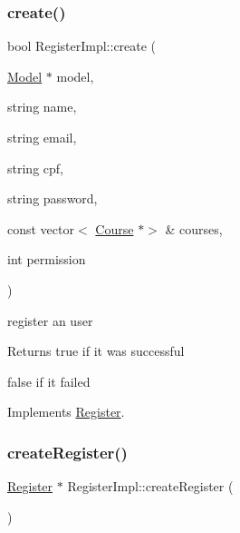 \mbox{\label{classRegisterImpl_af0463a5627b02b797a4a9d5d90f55a46}} 
\subsubsection{\texorpdfstring{create()}{create()}}
{\footnotesize\ttfamily bool Register\+Impl\+::create (\begin{DoxyParamCaption}\item[{\hyperlink{classModel}{Model} $\ast$}]{model,  }\item[{string}]{name,  }\item[{string}]{email,  }\item[{string}]{cpf,  }\item[{string}]{password,  }\item[{const vector$<$ \hyperlink{classCourse}{Course} $\ast$$>$ \&}]{courses,  }\item[{int}]{permission }\end{DoxyParamCaption})\hspace{0.3cm}{\ttfamily [virtual]}}



register an user 

\begin{DoxyReturn}{Returns}
true if it was successful 

false if it failed 
\end{DoxyReturn}


Implements \hyperlink{classRegister_acfb8b5ecf7181faff5584765d78ab671}{Register}.

\mbox{\label{classRegisterImpl_a505a9051efb8758a31da6ce97241741c}} 
\subsubsection{\texorpdfstring{create\+Register()}{createRegister()}}
{\footnotesize\ttfamily \hyperlink{classRegister}{Register} $\ast$ Register\+Impl\+::create\+Register (\begin{DoxyParamCaption}{ }\end{DoxyParamCaption})\hspace{0.3cm}{\ttfamily [static]}}



